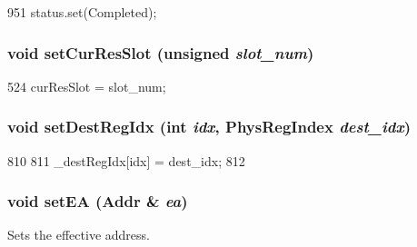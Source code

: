 \begin{DoxyCode}
951 { status.set(Completed); }
\end{DoxyCode}
\hypertarget{classInOrderDynInst_a2a0d7162a5f0908ca1c266d72f1de9f1}{
\subsubsection[{setCurResSlot}]{\setlength{\rightskip}{0pt plus 5cm}void setCurResSlot (unsigned {\em slot\_\-num})}}
\label{classInOrderDynInst_a2a0d7162a5f0908ca1c266d72f1de9f1}



\begin{DoxyCode}
524 { curResSlot = slot_num; }
\end{DoxyCode}
\hypertarget{classInOrderDynInst_a52c4bf83c16312f4158a64c39cb17969}{
\subsubsection[{setDestRegIdx}]{\setlength{\rightskip}{0pt plus 5cm}void setDestRegIdx (int {\em idx}, \/  {\bf PhysRegIndex} {\em dest\_\-idx})}}
\label{classInOrderDynInst_a52c4bf83c16312f4158a64c39cb17969}



\begin{DoxyCode}
810     {
811         _destRegIdx[idx] = dest_idx;
812     }
\end{DoxyCode}
\hypertarget{classInOrderDynInst_addd147868ea9ed46b5c943b0eaa57544}{
\subsubsection[{setEA}]{\setlength{\rightskip}{0pt plus 5cm}void setEA ({\bf Addr} \& {\em ea})}}
\label{classInOrderDynInst_addd147868ea9ed46b5c943b0eaa57544}
Sets the effective address. 


